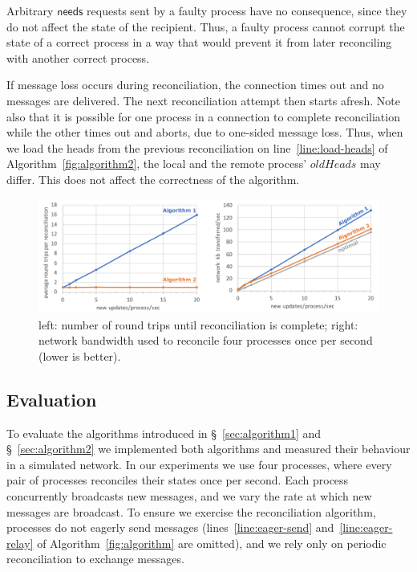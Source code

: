 \documentclass[a4paper,anonymous,USenglish]{lipics-v2019}
\begin{document}
Arbitrary $\mathsf{needs}$ requests sent by a faulty process have no consequence, since they do not affect the state of the recipient.
Thus, a faulty process cannot corrupt the state of a correct process in a way that would prevent it from later reconciling with another correct process.

If message loss occurs during reconciliation, the connection times out and no messages are delivered.
The next reconciliation attempt then starts afresh.
Note also that it is possible for one process in a connection to complete reconciliation while the other times out and aborts, due to one-sided message loss.
Thus, when we load the heads from the previous reconciliation on line~\ref{line:load-heads} of Algorithm~\ref{fig:algorithm2}, the local and the remote process' $\mathit{oldHeads}$ may differ.
This does not affect the correctness of the algorithm.

\begin{figure}
  \includegraphics[width=\textwidth,keepaspectratio=true]{figs/evaluation.pdf}
  \caption{left: number of round trips until reconciliation is complete; right: network bandwidth used to reconcile four processes once per second (lower is better).}
  \label{fig:evaluation}
\end{figure}

\subsection{Evaluation}\label{sec:evaluation}

To evaluate the algorithms introduced in \S~\ref{sec:algorithm1} and \S~\ref{sec:algorithm2} we implemented both algorithms and measured their behaviour in a simulated network.
In our experiments we use four processes, where every pair of processes reconciles their states once per second.
Each process concurrently broadcasts new messages, and we vary the rate at which new messages are broadcast.
To ensure we exercise the reconciliation algorithm, processes do not eagerly send messages (lines~\ref{line:eager-send} and~\ref{line:eager-relay} of Algorithm~\ref{fig:algorithm} are omitted), and we rely only on periodic reconciliation to exchange messages.
\end{document}
